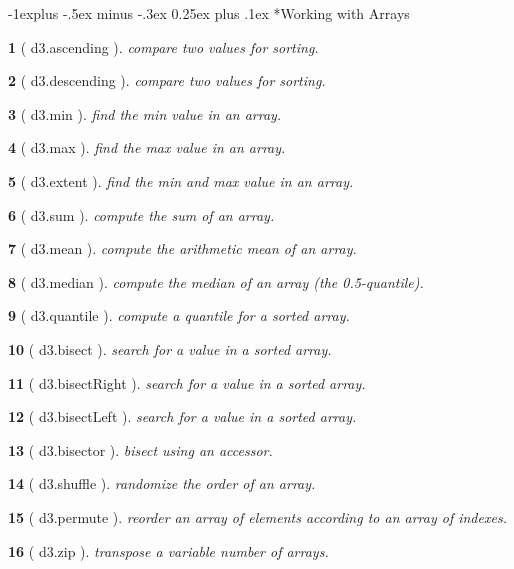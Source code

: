 \documentclass[10pt,landscape,letterpaper]{article}
\makeatletter
\newcounter{thm}
\theoremstyle{mytheoremstyle}
\newtheorem*{thm}{}
\renewcommand{\subsection}{\@startsection{subsection}{2}{0mm}%
                                {-1explus -.5ex minus -.3ex}%
                                {0.25ex plus .1ex}%
                                {\normalfont\normalsize\bfseries}}
\makeatother
\begin{document}
\begin{multicols}{3}
\subsection*{Working with Arrays}
\begin{thm} [ d3.ascending ]  compare two values for sorting.
\end{thm}\begin{thm} [ d3.descending ]  compare two values for sorting.
\end{thm}\begin{thm} [ d3.min ]  find the min value in an array.
\end{thm}\begin{thm} [ d3.max ]  find the max value in an array.
\end{thm}\begin{thm} [ d3.extent ]  find the min and max value in an array.
\end{thm}\begin{thm} [ d3.sum ]  compute the sum of an array. 
\end{thm}\begin{thm} [ d3.mean ]  compute the arithmetic mean of an array. 
\end{thm}\begin{thm} [ d3.median ]  compute the median of an array (the 0.5-quantile).
\end{thm}\begin{thm} [ d3.quantile ]  compute a quantile for a sorted array. 
\end{thm}\begin{thm} [ d3.bisect ]  search for a value in a sorted array.
\end{thm}\begin{thm} [ d3.bisectRight ]  search for a value in a sorted array.
\end{thm}\begin{thm} [ d3.bisectLeft ]  search for a value in a sorted array.
\end{thm}\begin{thm} [ d3.bisector ]  bisect using an accessor.
\end{thm}\begin{thm} [ d3.shuffle ]  randomize the order of an array.
\end{thm}\begin{thm} [ d3.permute ]  reorder an array of elements according to an array of indexes.
\end{thm}\begin{thm} [ d3.zip ]  transpose a variable number of arrays.

\end{thm}
\end{multicols}
\end{document}
